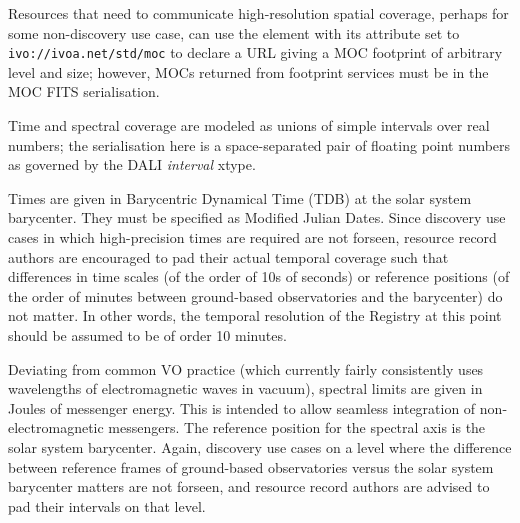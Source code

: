 \documentclass[11pt,a4paper]{ivoa}
\begin{document}
Resources that need to communicate high-resolution spatial coverage,
perhaps for some non-discovery use case, can use the 
element with its  attribute set to
\nolinkurl{ivo://ivoa.net/std/moc}  to declare a URL giving a MOC 
footprint of arbitrary level and size; however, MOCs returned from
footprint services must be in the MOC FITS serialisation.

Time and spectral coverage are modeled as unions of simple
intervals over real numbers; the serialisation here is a space-separated
pair of floating point numbers as governed by the DALI \emph{interval}
xtype.

Times are given in Barycentric Dynamical Time (TDB) at the solar system
barycenter.  They must be specified as Modified Julian Dates.  Since
discovery use cases in which high-precision times are required are not
forseen, resource record authors are encouraged to pad their actual
temporal coverage such that differences in time scales (of the order of
10s of seconds) or reference positions (of the order of minutes between
ground-based observatories and the barycenter) do not matter.  In other
words, the temporal resolution of the Registry at this point should be
assumed to be of order 10 minutes.

Deviating from common VO practice (which currently fairly consistently
uses wavelengths of electromagnetic waves in vacuum), spectral limits are
given in Joules of messenger energy.  This is intended to allow seamless
integration of non-electromagnetic messengers.  The reference position
for the spectral axis is the solar system barycenter.  Again, discovery
use cases on a level where the difference between reference frames of
ground-based observatories versus the solar system barycenter matters
are not forseen, and resource record authors are advised to pad their
intervals on that level.
\end{document}
